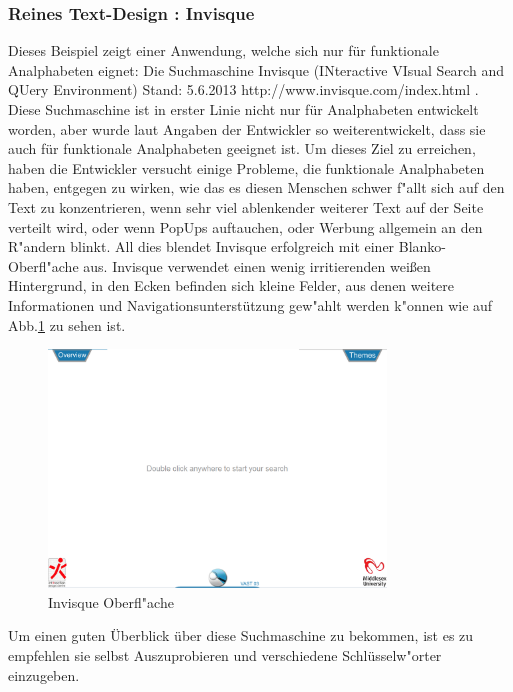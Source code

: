 \newpage

\subsubsection{Reines Text-Design : Invisque}
Dieses Beispiel zeigt einer Anwendung, welche sich nur für funktionale Analphabeten eignet: Die Suchmaschine Invisque (INteractive VIsual Search and QUery Environment)
						{Stand: 5.6.2013}
						{http://www.invisque.com/index.html}{}
.\\
Diese Suchmaschine ist in erster Linie nicht nur für Analphabeten entwickelt worden, aber wurde laut Angaben der Entwickler so weiterentwickelt, dass sie auch für funktionale Analphabeten geeignet ist. Um dieses Ziel zu erreichen, haben die Entwickler versucht einige Probleme, die funktionale Analphabeten haben, entgegen zu wirken, wie das es diesen Menschen schwer f"allt sich auf den Text zu konzentrieren, wenn sehr viel ablenkender weiterer Text auf der Seite verteilt wird, oder wenn PopUps auftauchen, oder Werbung allgemein an den R"andern blinkt. All dies blendet Invisque erfolgreich mit einer Blanko-Oberfl"ache aus. Invisque verwendet einen wenig irritierenden weißen Hintergrund, in den Ecken befinden sich kleine Felder, aus denen weitere Informationen und Navigationsunterstützung gew"ahlt werden k"onnen wie auf Abb.\ref{fig:Invisque} zu sehen ist.

\begin{figure}[h]
	\centering
		\includegraphics[width=0.80\textwidth]{Daten/Inisque.PNG}
	\caption{Invisque Oberfl"ache}
	\label{fig:Invisque}
\end{figure}

Um einen guten Überblick über diese Suchmaschine zu bekommen, ist es zu empfehlen sie selbst Auszuprobieren und verschiedene Schlüsselw"orter einzugeben.

